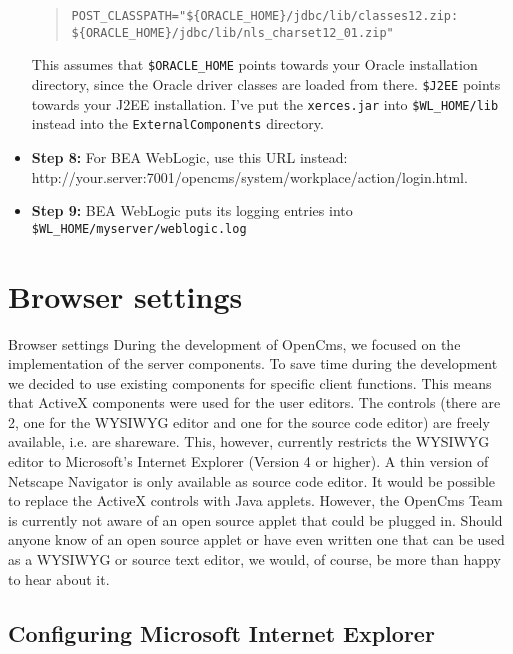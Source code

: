 \begin{itemize}
\begin{quote}
\begin{verbatim}
POST_CLASSPATH="${ORACLE_HOME}/jdbc/lib/classes12.zip:
${ORACLE_HOME}/jdbc/lib/nls_charset12_01.zip"
\end{verbatim}
\end{quote}

This assumes that \texttt{\$ORACLE\_HOME} points towards your Oracle installation
directory, since the Oracle driver classes are loaded from
there. \texttt{\$J2EE} points towards your J2EE installation. I've put the
\texttt{xerces.jar} into \texttt{\$WL\_HOME/lib} instead into the \texttt{ExternalComponents}
directory.

\item \textbf{Step 8:} For BEA WebLogic, use this URL instead: \\
http://your.server:7001/opencms/system/workplace/action/login.html.

\item \textbf{Step 9:} BEA WebLogic puts its logging entries into
\texttt{\$WL\_HOME/myserver/weblogic.log}

\end{itemize}

\section{Browser settings}

Browser settings
During the development of OpenCms, we focused on the implementation of the server components. 
To save time during the development we decided to use existing components for specific client 
functions. This means that ActiveX components were used for the user editors. 
The controls (there are 2, one for the WYSIWYG editor and one for the source code editor) 
are freely available, i.e. are shareware. This, however, currently restricts the WYSIWYG 
editor to Microsoft's Internet Explorer (Version 4 or higher). 
A thin version of Netscape Navigator is only available 
as source code editor. It would be possible to replace the ActiveX controls with Java applets. 
However, the OpenCms Team is currently not aware of an open source applet that could be 
plugged in. 
Should anyone know of an open source applet or have even  written one that can be used as a 
WYSIWYG  or source text editor,  we would, of course, be more than happy to hear about it.

\subsection{Configuring Microsoft Internet Explorer} 


